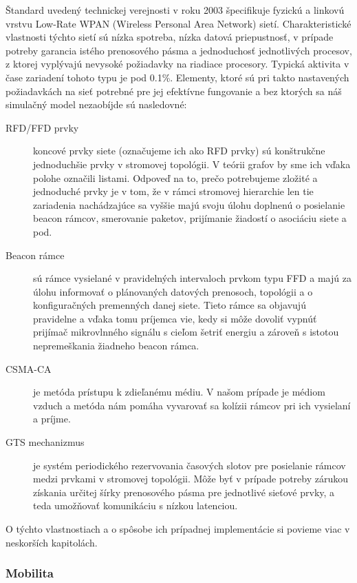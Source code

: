 \indent\indent Štandard uvedený technickej verejnosti v roku 2003 špecifikuje fyzickú a linkovú vrstvu Low-Rate WPAN (Wireless Personal Area Network) sietí. Charakteristické vlastnosti týchto sietí sú nízka spotreba, nízka datová priepustnosť, v prípade potreby garancia istého prenosového pásma a jednoduchosť jednotlivých procesov, z ktorej vyplývajú nevysoké požiadavky na riadiace procesory. Typická aktivita v čase zariadení tohoto typu je pod 0.1\%. Elementy, ktoré sú pri takto nastavených požiadavkách na sieť potrebné pre jej efektívne fungovanie a bez ktorých sa náš simulačný model nezaobíjde sú nasledovné:
\begin{description}
  \item[RFD/FFD prvky] koncové prvky siete (označujeme ich ako RFD prvky) sú konštrukčne jednoduchšie prvky v stromovej topológii. V teórii grafov by sme ich vďaka polohe označili listami. Odpoveď na to, prečo potrebujeme zložité a jednoduché prvky je v tom, že v rámci stromovej hierarchie len tie zariadenia nachádzajúce sa vyššie majú svoju úlohu doplnenú o posielanie beacon rámcov, smerovanie paketov, prijímanie žiadostí o asociáciu siete a pod.
  \item[Beacon rámce] sú rámce vysielané v pravidelných intervaloch prvkom typu FFD a majú za úlohu informovať o plánovaných datových prenosoch, topológii a o konfiguračných premenných danej siete. Tieto rámce sa objavujú pravidelne a vďaka tomu príjemca vie, kedy si môže dovoliť vypnúť prijímač mikrovlnného signálu s cieľom šetriť energiu a zároveň s istotou nepremeškania žiadneho beacon rámca.
  \item[CSMA-CA] je metóda prístupu k zdieľanému médiu. V našom prípade je médiom vzduch a metóda nám pomáha vyvarovať sa kolízii rámcov pri ich vysielaní a príjme.
  \item[GTS mechanizmus] je systém periodického rezervovania časových slotov pre posielanie rámcov medzi prvkami v stromovej topológii. Môže byť v prípade potreby zárukou získania určitej šírky prenosového pásma pre jednotlivé sieťové prvky, a teda umožňovať komunikáciu s nízkou latenciou.

 \end{description}
\indent\indent O týchto vlastnostiach a o spôsobe ich prípadnej implementácie si povieme viac v neskorších kapitolách.

\subsubsection{Mobilita}

